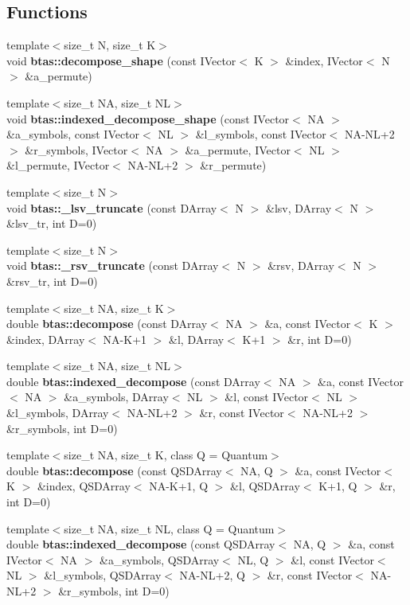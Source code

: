 \subsection*{Functions}
\begin{DoxyCompactItemize}
\item 
{\footnotesize template$<$size\-\_\-t N, size\-\_\-t K$>$ }\\void {\bf btas\-::decompose\-\_\-shape} (const I\-Vector$<$ K $>$ \&index, I\-Vector$<$ N $>$ \&a\-\_\-permute)
\item 
{\footnotesize template$<$size\-\_\-t N\-A, size\-\_\-t N\-L$>$ }\\void {\bf btas\-::indexed\-\_\-decompose\-\_\-shape} (const I\-Vector$<$ N\-A $>$ \&a\-\_\-symbols, const I\-Vector$<$ N\-L $>$ \&l\-\_\-symbols, const I\-Vector$<$ N\-A-\/N\-L+2 $>$ \&r\-\_\-symbols, I\-Vector$<$ N\-A $>$ \&a\-\_\-permute, I\-Vector$<$ N\-L $>$ \&l\-\_\-permute, I\-Vector$<$ N\-A-\/N\-L+2 $>$ \&r\-\_\-permute)
\item 
{\footnotesize template$<$size\-\_\-t N$>$ }\\void {\bf btas\-::\-\_\-lsv\-\_\-truncate} (const D\-Array$<$ N $>$ \&lsv, D\-Array$<$ N $>$ \&lsv\-\_\-tr, int D=0)
\item 
{\footnotesize template$<$size\-\_\-t N$>$ }\\void {\bf btas\-::\-\_\-rsv\-\_\-truncate} (const D\-Array$<$ N $>$ \&rsv, D\-Array$<$ N $>$ \&rsv\-\_\-tr, int D=0)
\item 
{\footnotesize template$<$size\-\_\-t N\-A, size\-\_\-t K$>$ }\\double {\bf btas\-::decompose} (const D\-Array$<$ N\-A $>$ \&a, const I\-Vector$<$ K $>$ \&index, D\-Array$<$ N\-A-\/K+1 $>$ \&l, D\-Array$<$ K+1 $>$ \&r, int D=0)
\item 
{\footnotesize template$<$size\-\_\-t N\-A, size\-\_\-t N\-L$>$ }\\double {\bf btas\-::indexed\-\_\-decompose} (const D\-Array$<$ N\-A $>$ \&a, const I\-Vector$<$ N\-A $>$ \&a\-\_\-symbols, D\-Array$<$ N\-L $>$ \&l, const I\-Vector$<$ N\-L $>$ \&l\-\_\-symbols, D\-Array$<$ N\-A-\/N\-L+2 $>$ \&r, const I\-Vector$<$ N\-A-\/N\-L+2 $>$ \&r\-\_\-symbols, int D=0)
\item 
{\footnotesize template$<$size\-\_\-t N\-A, size\-\_\-t K, class Q  = Quantum$>$ }\\double {\bf btas\-::decompose} (const Q\-S\-D\-Array$<$ N\-A, Q $>$ \&a, const I\-Vector$<$ K $>$ \&index, Q\-S\-D\-Array$<$ N\-A-\/K+1, Q $>$ \&l, Q\-S\-D\-Array$<$ K+1, Q $>$ \&r, int D=0)
\item 
{\footnotesize template$<$size\-\_\-t N\-A, size\-\_\-t N\-L, class Q  = Quantum$>$ }\\double {\bf btas\-::indexed\-\_\-decompose} (const Q\-S\-D\-Array$<$ N\-A, Q $>$ \&a, const I\-Vector$<$ N\-A $>$ \&a\-\_\-symbols, Q\-S\-D\-Array$<$ N\-L, Q $>$ \&l, const I\-Vector$<$ N\-L $>$ \&l\-\_\-symbols, Q\-S\-D\-Array$<$ N\-A-\/N\-L+2, Q $>$ \&r, const I\-Vector$<$ N\-A-\/N\-L+2 $>$ \&r\-\_\-symbols, int D=0)
\end{DoxyCompactItemize}


